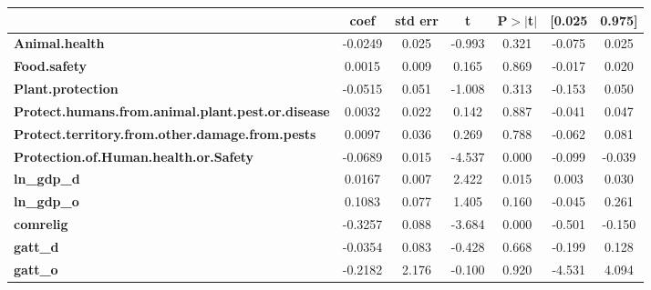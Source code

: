 \begin{center}
\begin{tabular}{lcccccc}
                                                          & \textbf{coef} & \textbf{std err} & \textbf{t} & \textbf{P$> |$t$|$} & \textbf{[0.025} & \textbf{0.975]}  \\
\midrule
\textbf{Animal.health}                                    &      -0.0249  &        0.025     &    -0.993  &         0.321        &       -0.075    &        0.025     \\
\textbf{Food.safety}                                      &       0.0015  &        0.009     &     0.165  &         0.869        &       -0.017    &        0.020     \\
\textbf{Plant.protection}                                 &      -0.0515  &        0.051     &    -1.008  &         0.313        &       -0.153    &        0.050     \\
\textbf{Protect.humans.from.animal.plant.pest.or.disease} &       0.0032  &        0.022     &     0.142  &         0.887        &       -0.041    &        0.047     \\
\textbf{Protect.territory.from.other.damage.from.pests}   &       0.0097  &        0.036     &     0.269  &         0.788        &       -0.062    &        0.081     \\
\textbf{Protection.of.Human.health.or.Safety}             &      -0.0689  &        0.015     &    -4.537  &         0.000        &       -0.099    &       -0.039     \\
\textbf{ln\_gdp\_d}                                       &       0.0167  &        0.007     &     2.422  &         0.015        &        0.003    &        0.030     \\
\textbf{ln\_gdp\_o}                                       &       0.1083  &        0.077     &     1.405  &         0.160        &       -0.045    &        0.261     \\
\textbf{comrelig}                                         &      -0.3257  &        0.088     &    -3.684  &         0.000        &       -0.501    &       -0.150     \\
\textbf{gatt\_d}                                          &      -0.0354  &        0.083     &    -0.428  &         0.668        &       -0.199    &        0.128     \\
\textbf{gatt\_o}                                          &      -0.2182  &        2.176     &    -0.100  &         0.920        &       -4.531    &        4.094     \\

\end{tabular}
\end{center}
